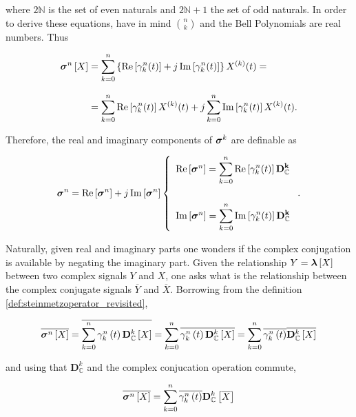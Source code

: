 	\noindent where $2\mathbb{N}$ is the set of even naturals and $2\mathbb{N}+1$ the set of odd naturals. In order to derive these equations, have in mind ${n\choose k}$ and the Bell Polynomials are real numbers. Thus

\begin{align} \boldsymbol{\sigma}^{n}\left[X\right] &= \sum\limits_{k=0}^n \left\{ \operatorname{Re}\left[\gamma_k^n(t)\right] + j\operatorname{Im}\left[\gamma_k^n(t)\right]\right\} X^{(k)}(t) = \nonumber\\[3mm] &= \sum\limits_{k=0}^n \operatorname{Re}\left[\gamma_k^n(t)\right] X^{(k)}(t) + j\sum\limits_{k=0}^n \operatorname{Im}\left[\gamma_k^n(t)\right] X^{(k)}(t) .\end{align}

	Therefore, the real and imaginary components of $\boldsymbol{\sigma}^{k}$ are definable as

\begin{equation} \boldsymbol{\sigma}^{n} = \operatorname{Re}\left[\boldsymbol{\sigma}^{n}\right] + j \operatorname{Im}\left[\boldsymbol{\sigma}^{n}\right] \left\{\begin{array}{l} \operatorname{Re}\left[\boldsymbol{\sigma}^{n}\right] = \displaystyle \sum_{k=0}^n \operatorname{Re}\left[\gamma_k^n(t)\right] \mathbf{D^k_\mathbb{C}} \\[10mm] \operatorname{Im}\left[\boldsymbol{\sigma}^{n}\right] = \displaystyle \sum_{k=0}^n \operatorname{Im}\left[\gamma_k^n(t)\right] \mathbf{D^k_\mathbb{C}} \end{array}\right. .\label{eq:ndpo_def_imre}\end{equation}

	Naturally, given real and imaginary parts one wonders if the complex conjugation is available by negating the imaginary part. Given the relationship $Y = \boldsymbol{\lambda}\left[X\right]$ between two complex signals $Y$ and $X$, one asks what is the relationship between the complex conjugate signals $\overline{Y}$ and $\overline{X}$. Borrowing from the definition \ref{def:steinmetzoperator_revisited},

\begin{equation}
	\overline{\boldsymbol{\sigma}^{n}\left[X\right]} = \overline{\sum_{k=0}^n \gamma_k^n \left(t\right)\mathbf{D}^k_\mathbb{C}\left[X\right]} = \sum_{k=0}^n \overline{\gamma_k^n \left(t\right)\mathbf{D}^k_\mathbb{C}\left[X\right]} = \sum_{k=0}^n \overline{\gamma_k^n \left(t\right)} \overline{\mathbf{D}^k_\mathbb{C}\left[X\right]}
\end{equation}

	\noindent and using that $\mathbf{D}^k_\mathbb{C}$ and the complex conjucation operation commute,

\begin{equation} \overline{\boldsymbol{\sigma}^{n}\left[X\right]} = \sum_{k=0}^n \overline{\gamma_k^n \left(t\right)} \mathbf{D}^k_\mathbb{C}\left[\overline{X}\right] \end{equation}

